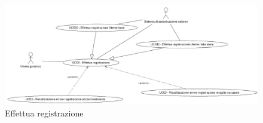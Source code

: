 \newpage
{}
\label{usecase:Effettua registrazione}

\begin{figure}[h]
	\centering
	\includegraphics[width=0.999\textwidth]{./uml/UCG9-10-11.png} 
	\caption{Effettua registrazione}
	\label{fig:UCG9-10-11}
  \end{figure}

